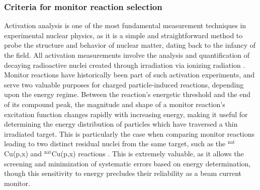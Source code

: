 \subsubsection{Criteria for monitor reaction selection}






Activation analysis is one of the most fundamental measurement techniques in experimental nuclear physics, as it is a simple and straightforward method to probe the structure and behavior of nuclear matter,  dating back to the infancy of the field. 
All activation measurements involve the analysis and quantification of decaying radioactive nuclei created through irradiation via ionizing radiation \cite{ehmann1993radiochemistry,krüger1971principles}.
Monitor reactions have  historically been part of such activation experiments, and serve two valuable purposes for charged particle-induced reactions, depending upon the energy regime.  
Between the reaction's energetic threshold  and the end of its compound peak, the magnitude and shape of a monitor reaction's excitation function changes rapidly with increasing energy, making it useful for determining the energy distribution of particles which have traversed a thin irradiated target.
This is particularly the case when comparing  monitor reactions leading to two distinct residual nuclei from the same target, such as the $^\text{nat}$Cu(p,x) and $^\text{nat}$Cu(p,x) reactions \cite{gul2001charged}.
This is extremely valuable, as it allows the screening and minimization of systematic errors based on energy determination, though this sensitivity to energy precludes their reliability as a beam current monitor.  


